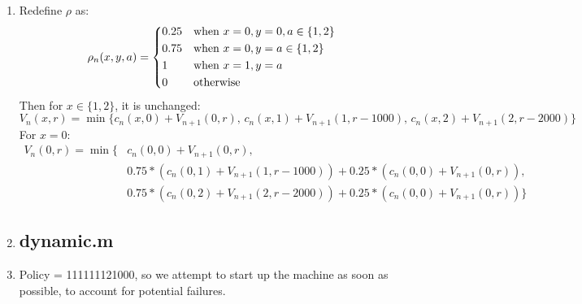 \documentclass[10pt,a4paper]{article}
\begin{document}
\begin{enumerate}
	\item Redefine \(\rho\) as: \\
	\[
	\rho_n(x, y, a) = \begin{dcases*}
	0.25 & when $x=0, y=0, a \in \{1, 2\}$ \\
	0.75 & when $x=0, y=a \in \{1, 2\}$ \\
	1 & when $x=1, y=a$ \\
	0 & otherwise
	\end{dcases*}
	\]
	Then for \(x \in \{1, 2\}\), it is unchanged:
	\begin{equation*}
	V_n(x, r) = \min\bigg\{c_n(x, 0) + V_{n+1}(0, r),\, c_n(x, 1) + V_{n+1}(1, r-1000),\, c_n(x, 2) + V_{n+1}(2, r-2000)\bigg\}
	\end{equation*}
	For \(x=0\):
	\begin{align*}
	V_n(0, r) = \min\bigg\{&c_n(0, 0) + V_{n+1}(0, r),\\
	&0.75*(c_n(0, 1) + V_{n+1}(1, r-1000)) + 0.25*(c_n(0, 0) + V_{n+1}(0, r)),\\
	&0.75*(c_n(0, 2) + V_{n+1}(2, r-2000)) + 0.25*(c_n(0, 0) + V_{n+1}(0, r))
	\bigg\}
	\end{align*}
	
	\newpage
	\item \subsection*{dynamic.m} 
	
	\newpage
	\item Policy = 111111121000, so we attempt to start up the machine as soon as possible, to account for potential failures.

\end{enumerate}
\end{document}

